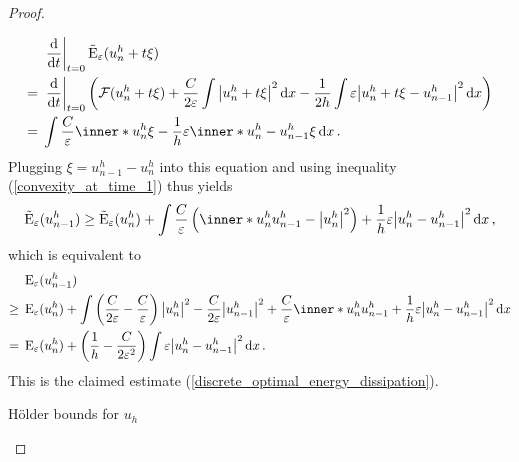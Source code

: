 \begin{proof}
\begin{description}[wide=0pt]
\begin{align*}
			&\left. \dv{ t } \right|_{ t= 0 }
			\tilde{\energy}_{ \varepsilon} ( u_{ n }^{ h } + t \xi )
			\\
			={}&
			\left. \dv{ t } \right|_{ t = 0 } 
			\left(
			\mathcal{ F } ( u_{ n }^{ h } + t \xi )
			+ 
			\frac{ C }{ 2 \varepsilon } 
			\int 
			\abs{ u_{ n }^{ h } + t \xi }^{ 2 } 
			\dd{ x }
			-
			\frac{ 1 }{ 2h } 
			\int 
			\varepsilon
			\abs{ u_{n }^{ h } + t \xi - u_{ n - 1 }^{ h } }^{ 2 } 
			\dd{ x }
			\right)
			\\
			={}& 
			\int
			\frac{ C }{ \varepsilon }
			\inner*{u_{ n }^{ h }}{\xi}
			-
			\frac{ 1 }{ h }
			\varepsilon
			\inner*{ u_{ n }^{ h } - u_{ n - 1 } ^{ h } }{ \xi }
			\dd{x}.
		\end{align*}
		Plugging $ \xi = u_{ n - 1 }^{ h } - u_{ n }^{ h } $ into this equation 
		and using inequality (\ref{convexity_at_time_1}) thus yields
		\begin{equation*}
			\tilde{\energy}_{ \varepsilon } ( u_{ n - 1 }^{ h } ) 
			\geq
			\tilde{\energy}_{ \varepsilon} ( u_{ n }^{ h } )
			+
			\int
			\frac{ C }{ \varepsilon } 
			\left(
			\inner*{ u_{n }^{ h }}{ u_{ n - 1 }^{ h } }
			-
			\abs{ u_{ n }^{ h }}^{ 2 }
			\right)
			+
			\frac{ 1 }{ h }
			\varepsilon
			\abs{ u_{n }^{ h } - u_{ n -1 }^{ h } }^{ 2 }
			\dd{ x },
		\end{equation*}
		which is equivalent to
		\begin{align*}
			& \energy_{ \varepsilon } (u_{ n - 1 }^{ h } )
			\\
			\geq {} &
			\energy_{ \varepsilon } (u_{ n }^{ h } ) +
			\int
			\left(
			\frac{ C }{ 2 \varepsilon }
			-
			\frac{ C }{ \varepsilon }
			\right)
			\abs{ u_{ n }^{ h } }^{ 2 }
			-
			\frac{ C }{ 2 \varepsilon }
			\abs{ u_{n - 1 }^{ h } }^{ 2 }
			+ 
			\frac{ C }{ \varepsilon }
			\inner*{ u_{ n }^{ h } }{ u_{ n - 1 }^{ h } }
			+ 
			\frac{ 1 }{ h }
			\varepsilon
			\abs{ u_{ n }^{ h } - u_{ n - 1 }^{ h } }^{ 2 }
			\dd{ x }
			\\
			= {} &
			\energy_{ \varepsilon } ( u_{n }^{ h } )
			+
			\left( 
			\frac{ 1 }{ h }
			- 
			\frac{ C }{ 2 \varepsilon^{ 2 } }
			\right)
			\int 
			\varepsilon \abs{ u_{n }^{ h } - u_{ n - 1 }^{ h } }^{ 2 }
			\dd{ x }.
		\end{align*}
		This is the claimed estimate 
		(\ref{discrete_optimal_energy_dissipation}).
		
		\item[Step 4:] Hölder bounds for $ u_{ h } $
		

\end{description}
\end{proof}
